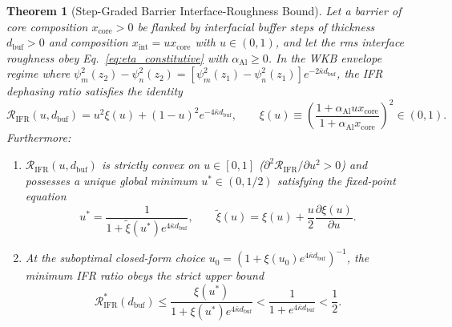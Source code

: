 \documentclass[11pt,letterpaper]{article}
\newtheorem{theorem}{Theorem}
\begin{document}
\begin{theorem}[Step-Graded Barrier Interface-Roughness Bound]
\label{thm:ifr_bound}
Let a barrier of core composition $x_{\mathrm{core}} > 0$ be flanked by interfacial buffer steps of thickness $d_{\mathrm{buf}} > 0$ and composition $x_{\mathrm{int}} = u x_{\mathrm{core}}$ with $u \in (0, 1)$, and let the rms interface roughness obey Eq.~\eqref{eq:eta_constitutive} with $\alpha_{\mathrm{Al}} \ge 0$. In the WKB envelope regime where $\psi_m^2(z_2) - \psi_n^2(z_2) = [\psi_m^2(z_1) - \psi_n^2(z_1)]e^{-2\bar{\kappa} d_{\mathrm{buf}}}$, the IFR dephasing ratio satisfies the identity
\begin{equation}
\mathcal{R}_{\mathrm{IFR}}(u, d_{\mathrm{buf}}) = u^2 \xi(u) + (1 - u)^2 e^{-4\bar{\kappa} d_{\mathrm{buf}}}, \qquad \xi(u) \equiv \left(\frac{1 + \alpha_{\mathrm{Al}} u x_{\mathrm{core}}}{1 + \alpha_{\mathrm{Al}} x_{\mathrm{core}}}\right)^2 \in (0, 1).
\label{eq:thm1_identity}
\end{equation}
Furthermore:
\begin{enumerate}
    \item[(a)] $\mathcal{R}_{\mathrm{IFR}}(u, d_{\mathrm{buf}})$ is strictly convex on $u \in [0, 1]$ ($\partial^2 \mathcal{R}_{\mathrm{IFR}}/\partial u^2 > 0$) and possesses a unique global minimum $u^* \in (0, 1/2)$ satisfying the fixed-point equation
    \begin{equation}
    u^* = \frac{1}{1 + \tilde{\xi}(u^*) e^{4\bar{\kappa} d_{\mathrm{buf}}}}, \qquad \tilde{\xi}(u) = \xi(u) + \frac{u}{2}\frac{\partial \xi(u)}{\partial u}.
    \label{eq:thm1_ustar}
    \end{equation}
    \item[(b)] At the suboptimal closed-form choice $u_0 = (1 + \xi(u_0)e^{4\bar{\kappa} d_{\mathrm{buf}}})^{-1}$, the minimum IFR ratio obeys the strict upper bound
    \begin{equation}
    \mathcal{R}_{\mathrm{IFR}}^*(d_{\mathrm{buf}}) \le \frac{\xi(u^*)}{1 + \xi(u^*) e^{4\bar{\kappa} d_{\mathrm{buf}}}} < \frac{1}{1 + e^{4\bar{\kappa} d_{\mathrm{buf}}}} < \frac{1}{2}.
    \label{eq:thm1_bound}
    \end{equation}
\end{enumerate}
\end{theorem}
\end{document}
